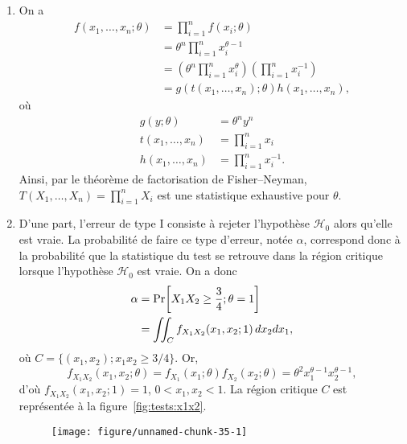 \begin{solution}{6.2}
    \begin{enumerate}
    \item On a
      \begin{align*}
        f(x_1, \dots, x_n;\theta) &= \prod_{i=1}^n f(x_i;\theta) \\
        &= \theta^n\prod_{i=1}^nx_i^{\theta-1} \\
        &= \left(
          \theta^n \prod_{i=1}^n x_i^\theta
        \right)
        \left(
          \prod_{i=1}^n x_i^{-1}
        \right) \\
        &= g(t(x_1, \dots, x_n); \theta) h(x_1, \dots, x_n),
      \end{align*}
      où
      \begin{align*}
        g(y; \theta) &= \theta^n y^n \\
        t(x_1, \dots, x_n) &= \prod_{i=1}^n x_i \\
        h(x_1, \dots, x_n) &= \prod_{i=1}^n x_i^{-1}.
      \end{align*}
      Ainsi, par le théorème de factorisation de Fisher--Neyman, $T(X_1, \dots, X_n) = \prod_{i = 1}^n X_i$ est une
      statistique exhaustive pour $\theta$.
    \item D'une part, l'erreur de type I consiste à rejeter
      l'hypothèse $ \mathcal{H}_0$ alors qu'elle est vraie. La probabilité de
      faire ce type d'erreur, notée $\alpha$, correspond donc à la probabilité que
      la statistique du test se retrouve dans la région critique
      lorsque l'hypothèse $ \mathcal{H}_0$ est vraie. On a donc
      \begin{align*}
        \alpha &= \mathrm{Pr}\! \left[ X_1X_2 \geq \frac{3}{4}; \theta = 1 \right] \\
        &= \iint_C f_{X_1 X_2}(x_1, x_2; 1)\, dx_2 dx_1,
      \end{align*}
      où $C = \{(x_1, x_2); x_1 x_2 \geq 3/4\}$. Or,
      $$
      f_{X_1 X_2}(x_1,
      x_2; \theta) = f_{X_1}(x_1; \theta) f_{X_2}(x_2; \theta) =
      \theta^2 x_1^{\theta - 1} x_2^{\theta - 1},
      $$
      d'où $f_{X_1
        X_2}(x_1, x_2; 1) = 1$, $0 < x_1, x_2 < 1$. La région critique
      $C$ est représentée à la figure~\ref{fig:tests:x1x2}.
      \begin{figure}
        \centering
\begin{knitrout}
\color{fgcolor}
\texttt{[image: figure/unnamed-chunk-35-1]}


\end{knitrout}
\end{figure}
\end{enumerate}
\end{solution}
